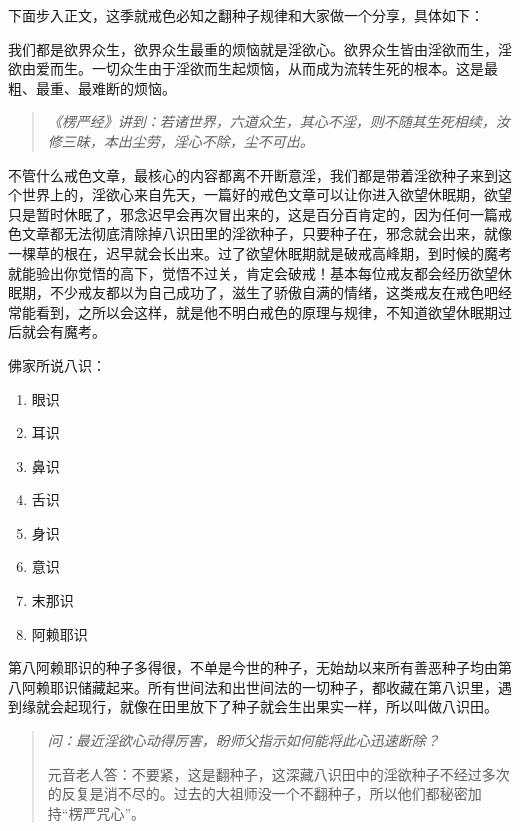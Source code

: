 下面步入正文，这季就戒色必知之翻种子规律和大家做一个分享，具体如下：

我们都是欲界众生，欲界众生最重的烦恼就是淫欲心。欲界众生皆由淫欲而生，淫欲由爱而生。一切众生由于淫欲而生起烦恼，从而成为流转生死的根本。这是最粗、最重、最难断的烦恼。

\begin{quote}\it
    《楞严经》讲到：若诸世界，六道众生，其心不淫，则不随其生死相续，汝修三昧，本出尘劳，淫心不除，尘不可出。
\end{quote}

不管什么戒色文章，最核心的内容都离不开断意淫，我们都是带着淫欲种子来到这个世界上的，淫欲心来自先天，一篇好的戒色文章可以让你进入欲望休眠期，欲望只是暂时休眠了，邪念迟早会再次冒出来的，这是百分百肯定的，因为任何一篇戒色文章都无法彻底清除掉八识田里的淫欲种子，只要种子在，邪念就会出来，就像一棵草的根在，迟早就会长出来。过了欲望休眠期就是破戒高峰期，到时候的魔考就能验出你觉悟的高下，觉悟不过关，肯定会破戒！基本每位戒友都会经历欲望休眠期，不少戒友都以为自己成功了，滋生了骄傲自满的情绪，这类戒友在戒色吧经常能看到，之所以会这样，就是他不明白戒色的原理与规律，不知道欲望休眠期过后就会有魔考。

佛家所说八识：

\begin{multicols}{4}
    \begin{enumerate}
        \item 眼识
        \item 耳识
        \item 鼻识
        \item 舌识
        \item 身识
        \item 意识
        \item 末那识
        \item 阿赖耶识
    \end{enumerate}
\end{multicols}

第八阿赖耶识的种子多得很，不单是今世的种子，无始劫以来所有善恶种子均由第八阿赖耶识储藏起来。所有世间法和出世间法的一切种子，都收藏在第八识里，遇到缘就会起现行，就像在田里放下了种子就会生出果实一样，所以叫做八识田。

\begin{quotation}\it
    问：最近淫欲心动得厉害，盼师父指示如何能将此心迅速断除？

    元音老人答：不要紧，这是翻种子，这深藏八识田中的淫欲种子不经过多次的反复是消不尽的。过去的大祖师没一个不翻种子，所以他们都秘密加持“楞严咒心”。
\end{quotation}

